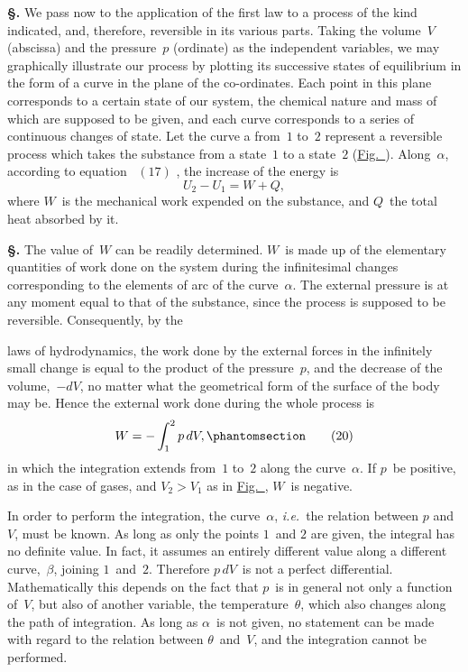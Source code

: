 \documentclass[12pt]{book}[2005/09/16]
\newcommand{\Section}[1]{
  \medskip\par\textbf{§\;#1}
  \label{section:#1}
}
\newcommand{\Tag}[1]{%
  \phantomsection\label{eqn:#1}\tag*{\ensuremath{#1}}%
}
\newcommand{\Eq}[1]{%
  \hyperref[eqn:#1]{\ensuremath{#1}}%
}
\newcommand{\Fig}[1]{\hyperref[fig:#1]{Fig.~{\upshape #1}}}
\newcommand{\Graphic}[2]{%
  \phantomsection\label{fig:#2}%
    \ifthenelse{\equal{#1}{}}{%
      \texttt{[image: ./images/\#2.pdf]}%
    }{%
      \texttt{[image: ./images/\#2.pdf]}%
    }
}
\newcommand{\Figure}[2][]{%
  \begin{figure}[hbtp!]
    \centering
    \phantomsection\label{fig:#2}
    \Graphic{#1}{fig#2}
  \end{figure}\ignorespaces%
}
\newcommand{\PageSep}[1]{\ignorespaces}
\newcommand{\ie}{\emph{i.e.}}
\begin{document}
\Section{74.} We pass now to the application of the first law to
a process of the kind indicated, and, therefore, reversible in
its various parts. Taking the volume~$V$ (abscissa) and
the pressure~$p$ (ordinate) as the independent variables, we
may graphically illustrate our process by plotting its successive
states of equilibrium in the form of a curve in the
plane of the co-ordinates. Each point in this plane corresponds
to a certain state of our system, the chemical
nature and mass of which are supposed to be given, and
each curve corresponds to a series of continuous changes
of state. Let the curve a from~$1$ to~$2$ represent a reversible
process which takes the substance from a state~$1$ to a state~$2$
(\Fig{2}). Along~$\alpha$, according to equation~\Eq{(17)}, the increase
of the energy is
\[
U_{2} - U_{1} = W + Q,
\]
\PageSep{52}
where $W$~is the mechanical work expended on the substance,
and $Q$~the total heat absorbed by it.

\Section{75.} The value of~$W$ can be readily determined. $W$~is
%
made up of the elementary quantities of work done on the
system during the infinitesimal changes corresponding to
the elements of arc of the curve~$\alpha$. The external pressure
is at any moment equal to that of the substance, since the
process is supposed to be reversible. Consequently, by the
\Figure{2}
laws of hydrodynamics, the work done by the external
forces in the infinitely small change is equal to the product
of the pressure~$p$, and the decrease of the volume,~$-dV$, no
matter what the geometrical form of the surface of the
body may be. Hence the external work done during the
whole process is
\[
W = -\int_{1}^{2} p\, dV,
\Tag{(20)}
\]
in which the integration extends from~$1$ to~$2$ along the
curve~$\alpha$. If $p$~be positive, as in the case of gases, and
$V_{2} > V_{1}$ as in \Fig{2}, $W$~is negative.
\PageSep{53}

In order to perform the integration, the curve~$\alpha$, \ie\ the
relation between $p$ and~$V$, must be known. As long as only
the points $1$~and $2$ are given, the integral has no definite
value. In fact, it assumes an entirely different value along
a different curve,~$\beta$, joining $1$~and~$2$. Therefore $p\, dV$~is
not a perfect differential. Mathematically this depends on
the fact that $p$~is in general not only a function of~$V$, but
also of another variable, the temperature~$\theta$, which also changes
along the path of integration. As long as $\alpha$~is not given,
no statement can be made with regard to the relation between
$\theta$~and~$V$, and the integration cannot be performed.
\end{document}
